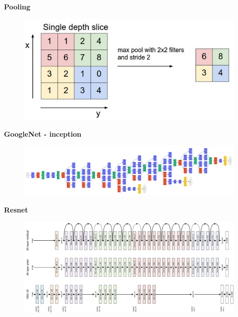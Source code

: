 \documentclass[xcolor=dvipsnames]{beamer}
\begin{document}
\begin{frame}{\bf Pooling}

\begin{figure}
\centering
\includegraphics[scale=0.5]{maxpool.png}
\end{figure}

\end{frame}

\begin{frame}{\bf GoogleNet - inception}

\begin{figure}
\centering
\includegraphics[scale=0.1]{googlenet.png}
\end{figure}

\end{frame}


\begin{frame}{\bf Resnet}

\begin{figure}
\centering
\includegraphics[scale=0.2]{resnet.png}
\end{figure}

\end{frame}
\end{document}
